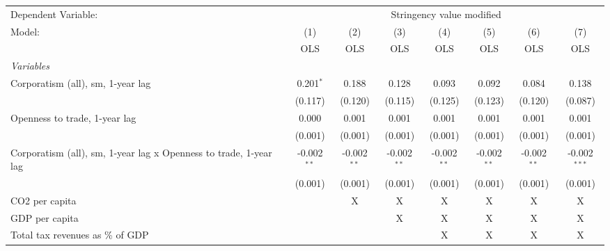 
\begingroup
\centering
\begin{tabular}{lccccccc}
   \toprule
   Dependent Variable: & \multicolumn{7}{c}{Stringency value modified}\\
   Model:                                                            & (1)           & (2)           & (3)           & (4)           & (5)           & (6)           & (7)\\  
                                                                     &  OLS          & OLS           & OLS           & OLS           & OLS           & OLS           & OLS\\  
   \midrule
   \emph{Variables}\\
   Corporatism (all), sm, 1-year lag                                 & 0.201$^{*}$   & 0.188         & 0.128         & 0.093         & 0.092         & 0.084         & 0.138\\   
                                                                     & (0.117)       & (0.120)       & (0.115)       & (0.125)       & (0.123)       & (0.120)       & (0.087)\\   
   Openness to trade, 1-year lag                                     & 0.000         & 0.001         & 0.001         & 0.001         & 0.001         & 0.001         & 0.001\\   
                                                                     & (0.001)       & (0.001)       & (0.001)       & (0.001)       & (0.001)       & (0.001)       & (0.001)\\   
   Corporatism (all), sm, 1-year lag x Openness to trade, 1-year lag & -0.002$^{**}$ & -0.002$^{**}$ & -0.002$^{**}$ & -0.002$^{**}$ & -0.002$^{**}$ & -0.002$^{**}$ & -0.002$^{***}$\\   
                                                                     & (0.001)       & (0.001)       & (0.001)       & (0.001)       & (0.001)       & (0.001)       & (0.001)\\   
   CO2 per capita                                                    &               & X             & X             & X             & X             & X             & X\\  
   GDP per capita                                                    &               &               & X             & X             & X             & X             & X\\  
   Total tax revenues as \% of GDP                                   &               &               &               & X             & X             & X             & X\\  

\end{tabular}
